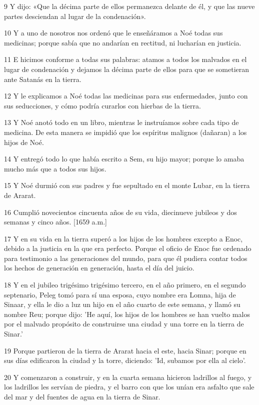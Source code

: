 \par 9 Y dijo: «Que la décima parte de ellos permanezca delante de él, y que las nueve partes desciendan al lugar de la condenación».
\par 10 Y a uno de nosotros nos ordenó que le enseñáramos a Noé todas sus medicinas; porque sabía que no andarían en rectitud, ni lucharían en justicia.
\par 11 E hicimos conforme a todas sus palabras: atamos a todos los malvados en el lugar de condenación y dejamos la décima parte de ellos para que se sometieran ante Satanás en la tierra.
\par 12 Y le explicamos a Noé todas las medicinas para sus enfermedades, junto con sus seducciones, y cómo podría curarlos con hierbas de la tierra.
\par 13 Y Noé anotó todo en un libro, mientras le instruíamos sobre cada tipo de medicina. De esta manera se impidió que los espíritus malignos (dañaran) a los hijos de Noé.
\par 14 Y entregó todo lo que había escrito a Sem, su hijo mayor; porque lo amaba mucho más que a todos sus hijos.
\par 15 Y Noé durmió con sus padres y fue sepultado en el monte Lubar, en la tierra de Ararat.
\par 16 Cumplió novecientos cincuenta años de su vida, diecinueve jubileos y dos semanas y cinco años. [1659 a.m.]
\par 17 Y en su vida en la tierra superó a los hijos de los hombres excepto a Enoc, debido a la justicia en la que era perfecto. Porque el oficio de Enoc fue ordenado para testimonio a las generaciones del mundo, para que él pudiera contar todos los hechos de generación en generación, hasta el día del juicio.
\par 18 Y en el jubileo trigésimo trigésimo tercero, en el año primero, en el segundo septenario, Peleg tomó para sí una esposa, cuyo nombre era Lomna, hija de Sinaar, y ella le dio a luz un hijo en el año cuarto de este semana, y llamó su nombre Reu; porque dijo: 'He aquí, los hijos de los hombres se han vuelto malos por el malvado propósito de construirse una ciudad y una torre en la tierra de Sinar.'
\par 19 Porque partieron de la tierra de Ararat hacia el este, hacia Sinar; porque en sus días edificaron la ciudad y la torre, diciendo: 'Id, subamos por ella al cielo'.
\par 20 Y comenzaron a construir, y en la cuarta semana hicieron ladrillos al fuego, y los ladrillos les servían de piedra, y el barro con que los unían era asfalto que sale del mar y del fuentes de agua en la tierra de Sinar.
